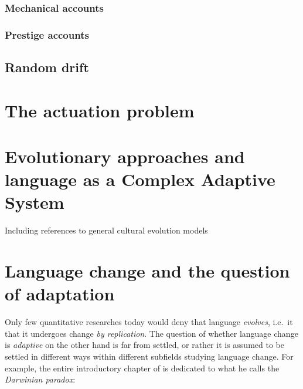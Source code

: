 \subsubsection{Mechanical accounts}


\subsubsection{Prestige accounts}

\subsection{Random drift}


\section{The actuation problem}


\section{Evolutionary approaches and language as a Complex Adaptive System}

Including references to general cultural evolution models

\section{Language change and the question of adaptation}

Only few quantitative researches today would deny that language \emph{evolves}, i.e.~it that it undergoes change \emph{by replication}. The question of whether language change is \emph{adaptive} on the other hand is far from settled, or rather it is assumed to be settled in different ways within different subfields studying language change.
For example, the entire introductory chapter of \citet{Labov2001} is dedicated to what he calls the \emph{Darwinian paradox}: 

